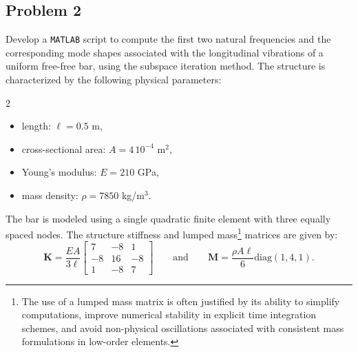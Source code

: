 \documentclass[12pt]{article}
\begin{document}
\subsection*{Problem 2}
Develop a \texttt{MATLAB} script to compute the first two natural frequencies and the corresponding mode shapes associated with the longitudinal vibrations of a uniform free-free bar, using the subspace iteration method. The structure is characterized by the following physical parameters:
\begin{multicols}{2}
  \begin{itemize}
    \item length: $\ell=0.5$ m,
    \item cross-sectional area: $A=4\,10^{-4}$ m$^2$,
    \item Young's modulus: $E=210$ GPa,
    \item mass density: $\rho=7850$ kg/m$^3$.
  \end{itemize}
\end{multicols}
The bar is modeled using a single quadratic finite element with three equally spaced nodes. The structure stiffness and lumped mass\footnote{The use of a lumped mass matrix is often justified by its ability to simplify computations, improve numerical stability in explicit time integration schemes, and avoid non-physical oscillations associated with consistent mass formulations in low-order elements.} matrices are given by:
\[
  \mathbf{K} = \frac{EA}{3\ell}
  \begin{bmatrix}
    7  & -8 & 1  \\
    -8 & 16 & -8 \\
    1  & -8 & 7
  \end{bmatrix}\qquad\text{and}\qquad
  \mathbf{M} = \frac{\rho A \ell}{6} \text{diag}(1, 4, 1).
\]
\end{document}
